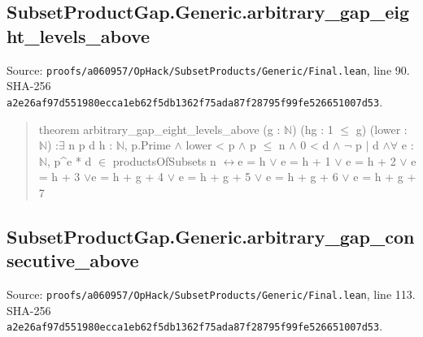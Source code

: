 \documentclass[11pt,a4paper]{article}
\begin{document}
\subsection{SubsetProductGap.Generic.arbitrary\_gap\_eight\_levels\_above}
Source: \texttt{proofs/a060957/OpHack/SubsetProducts/Generic/Final.lean}, line 90. SHA-256 \texttt{a2e26af97d551980ecca1eb62f5db1362f75ada87f28795f99fe526651007d53}.

\begin{quote}\small\ttfamily theorem arbitrary\_gap\_eight\_levels\_above (g : \ensuremath{\mathbb{N}}) (hg : 1 \ensuremath{\leq} g) (lower : \ensuremath{\mathbb{N}}) :\newline \ensuremath{\exists} n p d h : \ensuremath{\mathbb{N}}, p.Prime \ensuremath{\wedge} lower < p \ensuremath{\wedge} p \ensuremath{\leq} n \ensuremath{\wedge} 0 < d \ensuremath{\wedge} \ensuremath{\neg} p \ensuremath{\mid} d \ensuremath{\wedge}\newline \ensuremath{\forall} e : \ensuremath{\mathbb{N}}, p\textasciicircum{}e * d \ensuremath{\in} productsOfSubsets n \ensuremath{\leftrightarrow}\newline e = h \ensuremath{\vee} e = h + 1 \ensuremath{\vee} e = h + 2 \ensuremath{\vee} e = h + 3 \ensuremath{\vee}\newline e = h + g + 4 \ensuremath{\vee} e = h + g + 5 \ensuremath{\vee} e = h + g + 6 \ensuremath{\vee} e = h + g + 7\end{quote}
\subsection{SubsetProductGap.Generic.arbitrary\_gap\_consecutive\_above}
Source: \texttt{proofs/a060957/OpHack/SubsetProducts/Generic/Final.lean}, line 113. SHA-256 \texttt{a2e26af97d551980ecca1eb62f5db1362f75ada87f28795f99fe526651007d53}.
\end{document}
